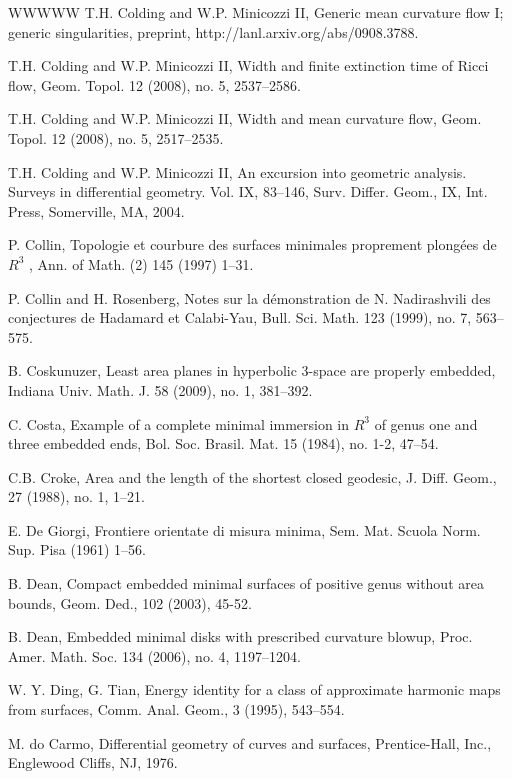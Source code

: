 \begin{thebibliography}{WWWWW}
 T.H. Colding and W.P. Minicozzi II, Generic mean curvature flow I; generic singularities, preprint, http://lanl.arxiv.org/abs/0908.3788.

 T.H. Colding and W.P. Minicozzi II, Width and finite extinction time of Ricci flow, Geom. Topol. 12 (2008), no. 5, 2537–2586.

 T.H. Colding and W.P. Minicozzi II, Width and mean curvature flow, Geom. Topol. 12 (2008), no. 5, 2517–2535.

 T.H. Colding and W.P. Minicozzi II, An excursion into geometric analysis. Surveys in differential geometry. Vol. IX, 83–146, Surv. Differ. Geom., IX, Int. Press, Somerville, MA, 2004.

 P. Collin, Topologie et courbure des surfaces minimales proprement plongées de $R^{3}$ , Ann. of Math. (2) 145 (1997) 1–31.

 P. Collin and H. Rosenberg, Notes sur la démonstration de N. Nadirashvili des conjectures de Hadamard et Calabi-Yau, Bull. Sci. Math. 123 (1999), no. 7, 563–575.

 B. Coskunuzer, Least area planes in hyperbolic 3-space are properly embedded, Indiana Univ. Math. J. 58 (2009), no. 1, 381–392.

 C. Costa, Example of a complete minimal immersion in $R^{3}$ of genus one and three embedded ends, Bol. Soc. Brasil. Mat. 15 (1984), no. 1-2, 47–54.

 C.B. Croke, Area and the length of the shortest closed geodesic, J. Diff. Geom., 27 (1988), no. 1, 1–21.

 E. De Giorgi, Frontiere orientate di misura minima, Sem. Mat. Scuola Norm. Sup. Pisa (1961) 1–56.

 B. Dean, Compact embedded minimal surfaces of positive genus without area bounds, Geom. Ded., 102 (2003), 45-52.

 B. Dean, Embedded minimal disks with prescribed curvature blowup, Proc. Amer. Math. Soc. 134 (2006), no. 4, 1197–1204.

 W. Y. Ding, G. Tian, Energy identity for a class of approximate harmonic maps from surfaces, Comm. Anal. Geom., 3 (1995), 543–554.

 M. do Carmo, Differential geometry of curves and surfaces, Prentice-Hall, Inc., Englewood Cliffs, NJ, 1976.


\end{thebibliography}
